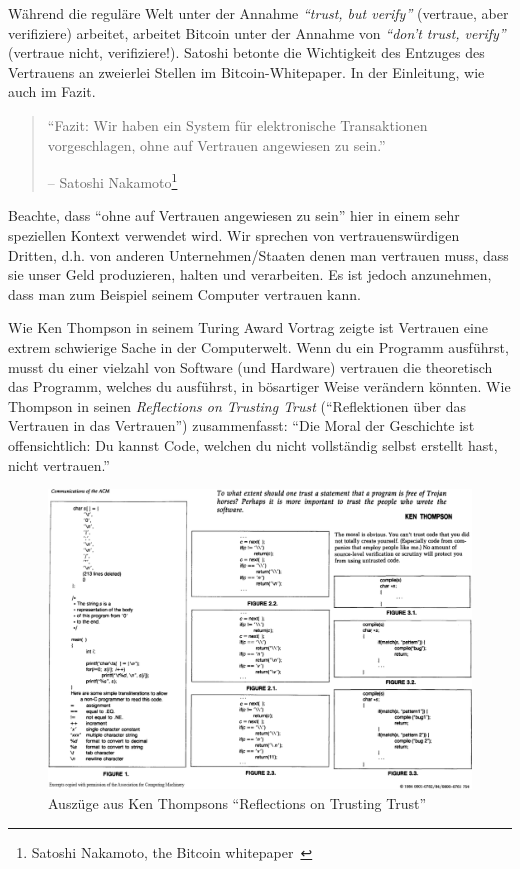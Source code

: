 Während die reguläre Welt unter der Annahme \textit{\enquote{trust, but verify}}
(vertraue, aber verifiziere) arbeitet, arbeitet Bitcoin unter der Annahme von
\textit{\enquote{don’t trust, verify}} (vertraue nicht, verifiziere!). Satoshi
betonte die Wichtigkeit des Entzuges des Vertrauens an zweierlei Stellen im
Bitcoin-Whitepaper. In der Einleitung, wie auch im Fazit.

\begin{quotation}\begin{samepage}
\enquote{Fazit: Wir haben ein System für elektronische Transaktionen
vorgeschlagen, ohne auf Vertrauen angewiesen zu sein.}
\begin{flushright} -- Satoshi Nakamoto\footnote{Satoshi Nakamoto, the Bitcoin
whitepaper~\cite{whitepaper}}
\end{flushright}\end{samepage}\end{quotation}

Beachte, dass \enquote{ohne auf Vertrauen angewiesen zu sein} hier in einem sehr
speziellen Kontext verwendet wird. Wir sprechen von vertrauenswürdigen Dritten,
d.h. von anderen Unternehmen/Staaten denen man vertrauen muss, dass sie unser
Geld produzieren, halten und verarbeiten. Es ist jedoch anzunehmen, dass man zum
Beispiel seinem Computer vertrauen kann.

Wie Ken Thompson in seinem Turing Award Vortrag zeigte ist Vertrauen eine extrem
schwierige Sache in der Computerwelt. Wenn du ein Programm ausführst, musst du
einer vielzahl von Software (und Hardware) vertrauen die theoretisch das
Programm, welches du ausführst, in bösartiger Weise verändern könnten. Wie
Thompson in seinen \textit{Reflections on Trusting Trust} (\enquote{Reflektionen
über das Vertrauen in das Vertrauen}) zusammenfasst: \enquote{Die Moral der
Geschichte ist offensichtlich: Du kannst Code, welchen du nicht vollständig
selbst erstellt hast, nicht vertrauen.}~\cite{trusting-trust}

\begin{figure}
  \includegraphics{assets/images/ken-thompson-hack.png}
  \caption{Auszüge aus Ken Thompsons \enquote{Reflections on Trusting Trust}}
  \label{fig:ken-thompson-hack}
\end{figure}

